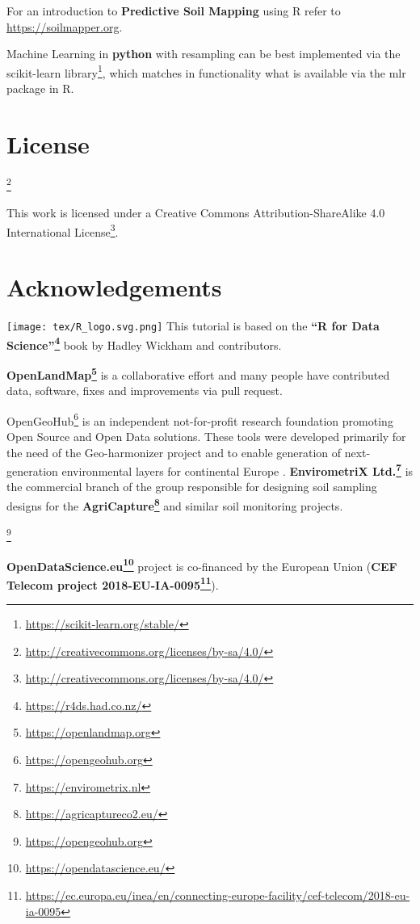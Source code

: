\documentclass[
  graybox,natbib,nospthms]{svmono}
\renewcommand{\href}[2]{#2 (\url{#1})}
\renewcommand{\href}[2]{#2\footnote{\url{#1}}}
\begin{document}
For an introduction to \textbf{Predictive Soil Mapping} using R refer to \url{https://soilmapper.org}.

Machine Learning in \textbf{python} with resampling can be best implemented via the
\href{https://scikit-learn.org/stable/}{scikit-learn library}, which matches in
functionality what is available via the mlr package in R.

\hypertarget{license}{%
\section*{License}\label{license}}

\href{http://creativecommons.org/licenses/by-sa/4.0/}{}

This work is licensed under a \href{http://creativecommons.org/licenses/by-sa/4.0/}{Creative Commons Attribution-ShareAlike 4.0 International License}.

\hypertarget{acknowledgements}{%
\section*{Acknowledgements}\label{acknowledgements}}

\texttt{[image: tex/R\_logo.svg.png]} This tutorial is based on the \textbf{\href{https://r4ds.had.co.nz/}{``R for Data Science''}}
book by Hadley Wickham and contributors.

\textbf{\href{https://openlandmap.org}{OpenLandMap}} is a collaborative effort and many people
have contributed data, software, fixes and improvements via pull request.

\href{https://opengeohub.org}{OpenGeoHub} is an independent not-for-profit research
foundation promoting Open Source and Open Data solutions. These tools were developed
primarily for the need of the Geo-harmonizer project and to enable generation of
next-generation environmental layers for continental Europe \citep{witjes2021spatiotemporal, Bonannella2022}.
\textbf{\href{https://envirometrix.nl}{EnvirometriX Ltd.}} is the commercial branch of the group
responsible for designing soil sampling designs for the \textbf{\href{https://agricaptureco2.eu/}{AgriCapture}}
and similar soil monitoring projects.

\href{https://opengeohub.org}{}

\textbf{\href{https://opendatascience.eu/}{OpenDataScience.eu}} project is co-financed by the European Union (\textbf{\href{https://ec.europa.eu/inea/en/connecting-europe-facility/cef-telecom/2018-eu-ia-0095}{CEF Telecom project 2018-EU-IA-0095}}).
\end{document}
